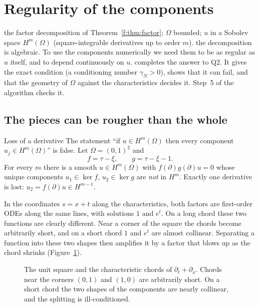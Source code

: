 \section{Regularity of the components}\label{f:ch:regular}
\sectionbrief
{the factor decomposition of Theorem~\ref{f:thm:factor}; $\Omega$ bounded; $u$ in a Sobolev space $H^m(\Omega)$ (square-integrable derivatives up to order $m$).}
{the decomposition is algebraic. To use the components numerically we need them to be as regular as $u$ itself, and to depend continuously on $u$.}
{completes the answer to Q2. It gives the exact condition (a conditioning number $\gamma_N>0$), shows that it can fail, and that the geometry of $\Omega$ against the characteristics decides it. Step~5 of the algorithm checks it.}

\subsection{The pieces can be rougher than the whole}

\begin{falsebox}{Loss of a derivative  \falsest}\label{f:cex:loss}
The statement ``if $u\in H^m(\Omega)$ then every component $u_j\in H^m(\Omega)$'' is false. Let $\Omega=(0,1)^2$ and
\[
f=\tau-\xi,\qquad g=\tau-\xi-1 .
\]
For every $m$ there is a smooth $u\in H^m(\Omega)$ with $f(\partial)g(\partial)u=0$ whose unique components $u_1\in\ker f$, $u_2\in\ker g$ are \emph{not} in $H^m$. Exactly one derivative is lost: $u_2=f(\partial)u\in H^{m-1}$.

\end{falsebox}

\begin{intuition}
In the coordinates $s=x+t$ along the characteristics, both factors are first-order ODEs along the same lines, with solutions $1$ and $e^{t}$. On a long chord these two functions are clearly different. Near a corner of the square the chords become arbitrarily short, and on a short chord $1$ and $e^{t}$ are almost collinear. Separating a function into these two shapes then amplifies it by a factor that blows up as the chord shrinks (Figure~\ref{fig:chords}).
\end{intuition}

\begin{figure}[!htb]
\centering
{}
\caption{The unit square and the characteristic chords of $\partial_t+\partial_x$. Chords near the corners $(0,1)$ and $(1,0)$ are arbitrarily short. On a short chord the two shapes of the components are nearly collinear, and the splitting is ill-conditioned.}\label{fig:chords}
\end{figure}

